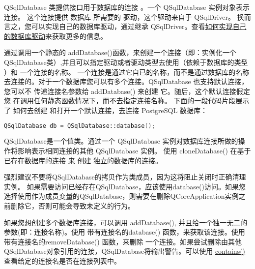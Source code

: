 QSqlDatabase 类提供接口用于数据库的连接 。一个 QSqlDatabase 实例对象表示连接。 这个连接提供 数据库 所需要的 驱动，这个驱动来自于 QSqlDriver。 换而言之，您可以实现自己的数据库驱动，通过继承 QSqlDriver。查看\href{https://doc.qt.io/qt-5/sql-driver.html#how-to-write-your-own-database-driver}{如何实现自己的数据库驱动}来获取更多的信息。

通过调用一个静态的 addDatabase()函数，来创建一个连接（即：实例化一个QSqlDatabase类）,并且可以指定驱动或者驱动类型去使用（依赖于数据库的类型 ）和 一个连接的名称。 一个连接是通过它自已的名称，而不是通过数据库的名称去连接的。对于一个数据库您可以有多个连接。QSqlDatabase 也支持默认连接，您可以不 传递连接名参数给 addDatabase() 来创建 它。随后，这个默认连接假定您 在调用任何静态函数情况下，而不去指定连接名称。 下面的一段代码片段展示了 如何去创建 和打开一个默认连接，去连接 PostgreSQL 数据库：

\begin{lstlisting}[language=C++]
QSqlDatabase db = QSqlDatabase::database();
\end{lstlisting}

QSqlDatabase是一个值类。通过一个 QSqlDatabase 实例对数据库连接所做的操作将影响表示相同连接的其他 QSqlDatabase 实例。 使用 cloneDatabase() 在基于已存在数据库的连接 来 创建 独立的数据库的连接。

\begin{warning}
强烈建议不要将QSqlDatabase的拷贝作为类成员，因为这将阻止关闭时正确清理实例。 如果需要访问已经存在QSqlDatabase，应该使用database()访问。如果您选择使用作为成员变量的QSqlDatabase，则需要在删除QCoreApplication实例之前删除它，否则可能会导致未定义的行为。
\end{warning}

如果您想创建多个数据库连接，可以调用 addDatabase(), 并且给一个独一无二的参数(即：连接名称)。使用 带有连接名的database() 函数，来获取该连接。使用 带有连接名的removeDatabase() 函数，来删除 一个连接。如果尝试删除由其他QSqlDatabase对象引用的连接，QSqlDatabase将输出警告。可以使用 \href{https://github.com/QtDocumentCN/QtDocumentCN/blob/master/Src/S/QSqlDatabase/QSqlDatabase.md#static-bool-qsqldatabasecontainsconst-qstring-connectionname--qlatin1stringdefaultconnection}{contains()}查看给定的连接名是否在连接列表中。


